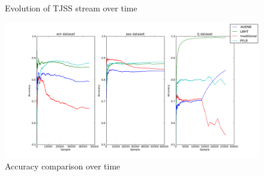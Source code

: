 \documentclass[conference]{IEEEtran}
\begin{document}
\begin{figure}
\begin{center}
  \end{center}
  \caption{Evolution of TJSS stream over time}
\label{fig:syntheticstream} 
\end{figure}

\begin{figure}
\captionsetup{justification=centering}
\centering
\includegraphics[scale=0.4]{fig/running_accuracy.png}
\caption{Accuracy comparison over time}
\label{fig:runningaccuracy} 
\end{figure}
\end{document}
